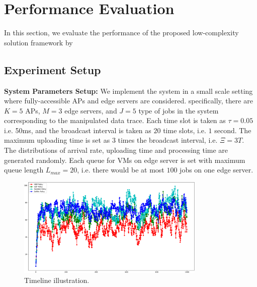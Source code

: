 \section{Performance Evaluation}
\label{sec:evaluation}
In this section, we evaluate the performance of the proposed low-complexity solution framework by

\subsection{Experiment Setup}
\textbf{System Parameters Setup:}
We implement the system in a small scale setting where fully-accessible APs and edge servers are considered.
specifically, there are $K=5$ APs, $M=3$ edge servers, and $J=5$ type of jobs in the system corresponding to the manipulated data trace.
Each time slot is taken as $\tau = 0.05$ i.e. 50ms, and the broadcast interval is taken as $20$ time slots, i.e. $1$ second.
The maximum uploading time is set as $3$ times the broadcast interval, i.e. $\Xi = 3T$.
The distributions of arrival rate, uploading time and processing time are generated randomly.
Each queue for VMs on edge server is set with maximum queue length $L_{max}=20$, i.e. there would be at most $100$ jobs on one edge server.

\begin{figure}[ht!]
    \centering
    \includegraphics[width=0.80\textwidth]{images/Figure_1.pdf}
    \caption{Timeline illustration.}
    \label{fig:general_timeline}
\end{figure}

